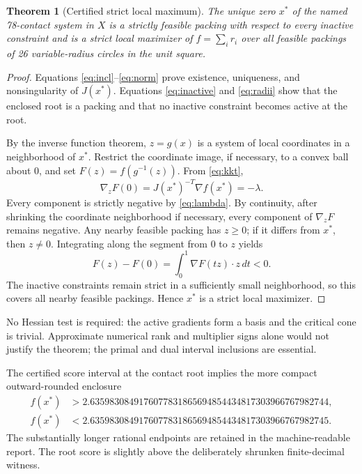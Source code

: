 \documentclass[11pt]{article}
\newtheorem{theorem}{Theorem}
\begin{document}
\begin{theorem}[Certified strict local maximum]                         \label{thm:main}
The unique zero $x^*$ of the named 78-contact system in $X$ is a strictly
feasible packing with respect to every inactive constraint and is a strict
local maximizer of $f=\sum_i r_i$ over all feasible packings of 26
variable-radius circles in the unit square.
\end{theorem}

\begin{proof}
Equations \eqref{eq:incl}--\eqref{eq:norm} prove existence, uniqueness, and
nonsingularity of $J(x^*)$.  Equations \eqref{eq:inactive} and
\eqref{eq:radii} show that the enclosed root is a packing and that no inactive
constraint becomes active at the root.

By the inverse function theorem, $z=g(x)$ is a system of local coordinates in
a neighborhood of $x^*$.  Restrict the coordinate image, if necessary, to a
convex ball about $0$, and set $F(z)=f(g^{-1}(z))$.  From
\eqref{eq:kkt},
\[
  \nabla_zF(0)=J(x^*)^{-T}\nabla f(x^*)=-\lambda.
\]
Every component is strictly negative by \eqref{eq:lambda}.  By continuity,
after shrinking the coordinate neighborhood if necessary, every component of
$\nabla_zF$ remains negative.  Any nearby feasible packing has $z\geq0$;
if it differs from $x^*$, then $z\neq0$.  Integrating along the segment from
$0$ to $z$ yields
\[
 F(z)-F(0)=\int_0^1\nabla F(tz)\mathbin{\cdot}z\,dt<0.
\]
The inactive constraints remain strict in a sufficiently small neighborhood,
so this covers all nearby feasible packings.  Hence $x^*$ is a strict local
maximizer.
\end{proof}

No Hessian test is required: the active gradients form a basis and the
critical cone is trivial.  Approximate numerical rank and multiplier signs
alone would not justify the theorem; the primal and dual interval inclusions
are essential.

The certified score interval at the contact root implies the more compact
outward-rounded enclosure
\[
\begin{aligned}
f(x^*)&>2.6359830849176077831865694854434817303966767982744,\\
f(x^*)&<2.6359830849176077831865694854434817303966767982745.
\end{aligned}
\]
The substantially longer rational endpoints are retained in the
machine-readable report.  The root score is slightly above the deliberately
shrunken finite-decimal witness.
\end{document}
